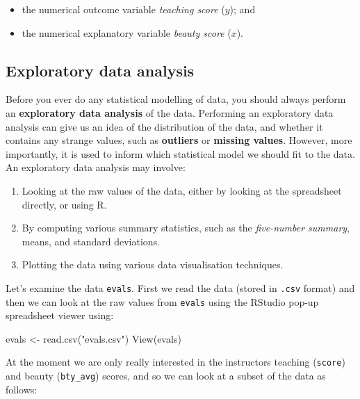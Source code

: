 \documentclass[
  letterpaper,
  DIV=11,
  numbers=noendperiod]{scrartcl}
\newenvironment{Shaded}{\begin{snugshade}}{\end{snugshade}}
\newcommand{\FunctionTok}[1]{\textcolor[rgb]{0.28,0.35,0.67}{#1}}
\newcommand{\NormalTok}[1]{\textcolor[rgb]{0.00,0.23,0.31}{#1}}
\newcommand{\OtherTok}[1]{\textcolor[rgb]{0.00,0.23,0.31}{#1}}
\newcommand{\StringTok}[1]{\textcolor[rgb]{0.13,0.47,0.30}{#1}}
\providecommand{\tightlist}{%
  \setlength{\itemsep}{0pt}\setlength{\parskip}{0pt}}\usepackage{longtable,booktabs,array}
\begin{document}
\begin{itemize}
\tightlist
\item
  the numerical outcome variable \emph{teaching score} (\(y\)); and
\item
  the numerical explanatory variable \emph{beauty score} (\(x\)).
\end{itemize}

\subsection{Exploratory data analysis}\label{exploratory-data-analysis}

Before you ever do any statistical modelling of data, you should always
perform an \textbf{exploratory data analysis} of the data. Performing an
exploratory data analysis can give us an idea of the distribution of the
data, and whether it contains any strange values, such as
\textbf{outliers} or \textbf{missing values}. However, more importantly,
it is used to inform which statistical model we should fit to the data.
An exploratory data analysis may involve:

\begin{enumerate}
\def\labelenumi{\arabic{enumi}.}
\tightlist
\item
  Looking at the raw values of the data, either by looking at the
  spreadsheet directly, or using R.
\item
  By computing various summary statistics, such as the \emph{five-number
  summary}, means, and standard deviations.
\item
  Plotting the data using various data visualisation techniques.
\end{enumerate}

Let's examine the data \texttt{evals}. First we read the data (stored in
\texttt{.csv} format) and then we can look at the raw values from
\texttt{evals} using the RStudio pop-up spreadsheet viewer using:

\begin{Shaded}
\begin{Highlighting}[]
\NormalTok{evals }\OtherTok{\textless{}{-}} \FunctionTok{read.csv}\NormalTok{(}\StringTok{"evals.csv"}\NormalTok{)}
\FunctionTok{View}\NormalTok{(evals)}
\end{Highlighting}
\end{Shaded}

At the moment we are only really interested in the instructors teaching
(\texttt{score}) and beauty (\texttt{bty\_avg}) scores, and so we can
look at a subset of the data as follows:
\end{document}
